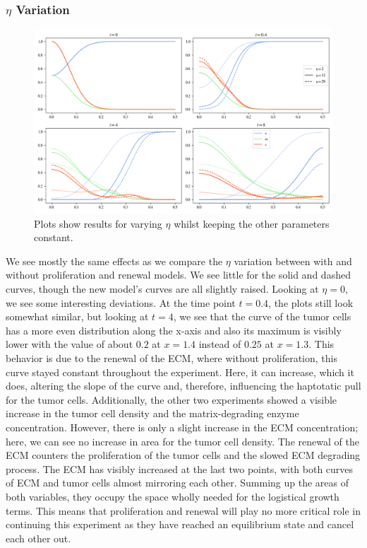 \subsubsection*{$\eta$ Variation}
\begin{figure}[h]
    \centering
    \includegraphics[width=\textwidth]{resources/images/prolif_eta_variation.png}
    \caption{Plots show results for varying $\eta$ whilst keeping the other parameters constant.}
    \label{fig:prolif_eta_variation}
\end{figure}

We see mostly the same effects as we compare the $\eta$ variation between with and without proliferation and renewal models. We see little for the solid and dashed curves, though the new model's curves are all slightly raised. Looking at $\eta=0$, we see some interesting deviations. At the time point $t=0.4$, the plots still look somewhat similar, but looking at $t=4$, we see that the curve of the tumor cells has a more even distribution along the x-axis and also its maximum is visibly lower with the value of about $0.2$ at $x=1.4$ instead of $0.25$ at $x=1.3$. This behavior is due to the renewal of the ECM, where without proliferation, this curve stayed constant throughout the experiment. Here, it can increase, which it does, altering the slope of the curve and, therefore, influencing the haptotatic pull for the tumor cells.
Additionally, the other two experiments showed a visible increase in the tumor cell density and the matrix-degrading enzyme concentration. However, there is only a slight increase in the ECM concentration; here, we can see no increase in area for the tumor cell density. The renewal of the ECM counters the proliferation of the tumor cells and the slowed ECM degrading process. The ECM has visibly increased at the last two points, with both curves of ECM and tumor cells almost mirroring each other. Summing up the areas of both variables, they occupy the space wholly needed for the logistical growth terms. This means that proliferation and renewal will play no more critical role in continuing this experiment as they have reached an equilibrium state and cancel each other out. 


